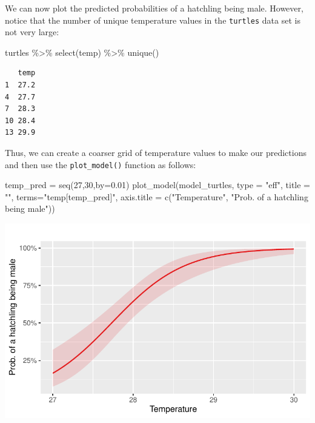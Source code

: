 \documentclass[
  letterpaper,
  DIV=11,
  numbers=noendperiod]{scrartcl}
\newenvironment{Shaded}{\begin{snugshade}}{\end{snugshade}}
\newcommand{\AttributeTok}[1]{\textcolor[rgb]{0.40,0.45,0.13}{#1}}
\newcommand{\DecValTok}[1]{\textcolor[rgb]{0.68,0.00,0.00}{#1}}
\newcommand{\FloatTok}[1]{\textcolor[rgb]{0.68,0.00,0.00}{#1}}
\newcommand{\FunctionTok}[1]{\textcolor[rgb]{0.28,0.35,0.67}{#1}}
\newcommand{\NormalTok}[1]{\textcolor[rgb]{0.00,0.23,0.31}{#1}}
\newcommand{\OtherTok}[1]{\textcolor[rgb]{0.00,0.23,0.31}{#1}}
\newcommand{\SpecialCharTok}[1]{\textcolor[rgb]{0.37,0.37,0.37}{#1}}
\newcommand{\StringTok}[1]{\textcolor[rgb]{0.13,0.47,0.30}{#1}}
\begin{document}
\begin{tcolorbox}
\end{tcolorbox}

We can now plot the predicted probabilities of a hatchling being male.
However, notice that the number of unique temperature values in the
\texttt{turtles} data set is not very large:

\begin{Shaded}
\begin{Highlighting}[]
\NormalTok{ turtles }\SpecialCharTok{\%\textgreater{}\%} \FunctionTok{select}\NormalTok{(temp) }\SpecialCharTok{\%\textgreater{}\%} \FunctionTok{unique}\NormalTok{() }
\end{Highlighting}
\end{Shaded}

\begin{verbatim}
   temp
1  27.2
4  27.7
7  28.3
10 28.4
13 29.9
\end{verbatim}

Thus, we can create a coarser grid of temperature values to make our
predictions and then use the \texttt{plot\_model()} function as follows:

\begin{Shaded}
\begin{Highlighting}[]
\NormalTok{temp\_pred }\OtherTok{=} \FunctionTok{seq}\NormalTok{(}\DecValTok{27}\NormalTok{,}\DecValTok{30}\NormalTok{,}\AttributeTok{by=}\FloatTok{0.01}\NormalTok{)}
\FunctionTok{plot\_model}\NormalTok{(model\_turtles, }
           \AttributeTok{type =} \StringTok{"eff"}\NormalTok{, }
           \AttributeTok{title =} \StringTok{""}\NormalTok{, }
           \AttributeTok{terms=}\StringTok{"temp[temp\_pred]"}\NormalTok{, }
           \AttributeTok{axis.title =} \FunctionTok{c}\NormalTok{(}\StringTok{"Temperature"}\NormalTok{, }\StringTok{"Prob. of a hatchling being male"}\NormalTok{))}
\end{Highlighting}
\end{Shaded}

\includegraphics{index_files/figure-pdf/unnamed-chunk-11-1.pdf}
\end{document}
